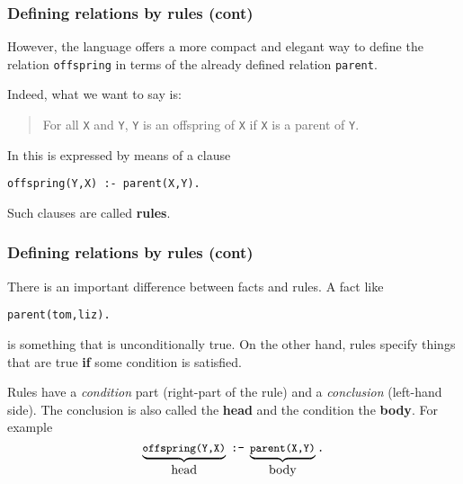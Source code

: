 %
\begin{frame}[containsverbatim]
\frametitle{Defining relations by rules (cont)}

However, the \Prolog language offers a more compact and elegant way to
define the relation \texttt{offspring} in terms of the already defined
relation \texttt{parent}.

\bigskip

Indeed, what we want to say is: 
\begin{quote}
For all \texttt{X} and \texttt{Y},
\texttt{Y} is an offspring of \texttt{X} if \texttt{X} is a parent of
\texttt{Y}.
\end{quote}
In \Prolog this is expressed by means of a clause
{\small
\begin{verbatim}
offspring(Y,X) :- parent(X,Y).
\end{verbatim}
}
Such clauses are called \textbf{rules}.

\end{frame}

%
\begin{frame}[containsverbatim]
\frametitle{Defining relations by rules (cont)}

There is an important difference between facts and rules. A fact like
{\small
\begin{verbatim}
parent(tom,liz).
\end{verbatim}
} 
is something that is unconditionally true. On the other hand, rules
specify things that are true \textbf{if} some condition is satisfied.

Rules have a \emph{condition} part (right-part of the rule) and a
\emph{conclusion} (left-hand side). The conclusion is also called the
\textbf{head} and the condition the \textbf{body}. For example
\[
\underbrace{\texttt{\small offspring(Y,X)}}_{\textrm{\normalsize head}} \;
\texttt{:-} \; \underbrace{\texttt{\small
    parent(X,Y)}}_{\textrm{\normalsize body}}\texttt{.}
\]

\end{frame}


